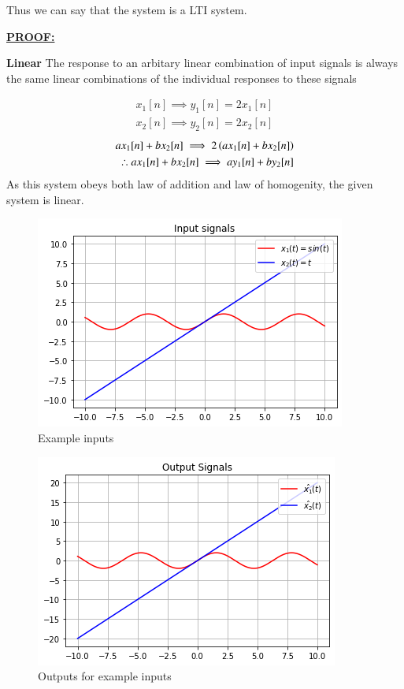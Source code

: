 \documentclass[journal,12pt,twocolumn]{IEEEtran}
\begin{document}
Thus we can say that the system is a LTI system. 

\underline{\textbf{PROOF:}}
\begin{definition}{\textbf{Linear}}
The response to an arbitary linear combination of input signals is always the same linear combinations of the individual responses to these signals 
\end{definition}
\begin{align}
    x_{1}[n] \implies y_{1}[n]= 2x_{1}[n]\\
    x_{2}[n] \implies y_{2}[n]= 2x_{2}[n]
\end{align}
\begin{align}
    ax_{1}[n]+bx_{2}[n] \implies 2\left(ax_{1}[n]+bx_{2}[n]\right)\\
    \therefore ax_{1}[n]+bx_{2}[n] \implies ay_{1}[n]+by_{2}[n]
\end{align}
As this system obeys both law of addition and law of homogenity, the given system is linear.
\begin{figure}[!htp]
    \centering
    \includegraphics[width = \columnwidth]{a.PNG}
    \caption{Example inputs}
    \label{f11}
\end{figure}
\begin{figure}[!htp]
    \centering
    \includegraphics[width = \columnwidth]{b.PNG}
    \caption{Outputs for example inputs}
    \label{f21}
\end{figure}
\end{document}
